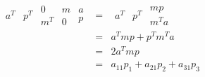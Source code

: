\documentclass{article}
\begin{document}
\begin{eqnarray*}
\begin{array}{cc}
a^{T} & p^{T}%
\end{array}%
\begin{array}{cc}
0 & m \\ 
m^{T} & 0%
\end{array}%
\begin{array}{c}
a \\ 
p%
\end{array}
&=&%
\begin{array}{cc}
a^{T} & p^{T}%
\end{array}%
\begin{array}{c}
mp \\ 
m^{T}a%
\end{array}
\\
&=&a^{T}mp+p^{T}m^{T}a \\
&=&2a^{T}mp \\
&=&a_{11}p_{1}+a_{21}p_{2}+a_{31}p_{3}
\end{eqnarray*}%
\end{document}
